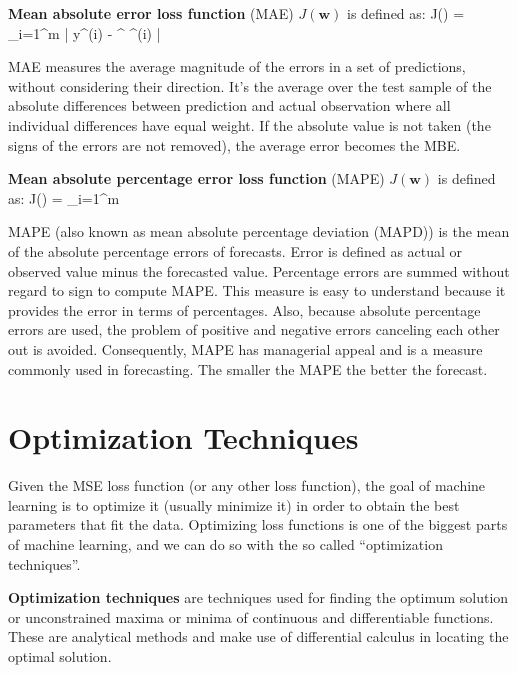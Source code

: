 \textbf{Mean absolute error loss function} (MAE) $J(\boldsymbol{w})$ is defined as:
\bse
J() =  \sum_{i=1}^{m} | y^{(i)} - ^{\intercal} ^{(i)} |
\ese
\ed

MAE measures the average magnitude of the errors in a set of predictions, without considering their direction. It's
the average over the test sample of the absolute differences between prediction and actual observation where all
individual differences have equal weight. If the absolute value is not taken (the signs of the errors are not
removed), the average error becomes the MBE\@.

\textbf{Mean absolute percentage error loss function} (MAPE) $J(\boldsymbol{w})$ is defined as:
\bse
J() =  \sum_{i=1}^{m} \Big{|}  \Big{|}
\ese
\ed

MAPE (also known as mean absolute percentage deviation (MAPD)) is the mean of the absolute percentage errors of
forecasts. Error is defined as actual or observed value minus the forecasted value. Percentage errors are summed
without regard to sign to compute MAPE. This measure is easy to understand because it provides the error in terms of
percentages. Also, because absolute percentage errors are used, the problem of positive and negative errors canceling
each other out is avoided. Consequently, MAPE has managerial appeal and is a measure commonly used in forecasting.
The smaller the MAPE the better the forecast.

\section{Optimization Techniques}

Given the MSE loss function (or any other loss function), the goal of machine learning is to optimize it (usually
minimize it) in order to obtain the best parameters that fit the data. Optimizing loss functions is one of the
biggest parts of machine learning, and we can do so with the so called ``optimization techniques''.

\textbf{Optimization techniques} are techniques used for finding the optimum solution or unconstrained maxima or
minima of continuous and differentiable functions. These are analytical methods and make use of differential calculus
in locating the optimal solution.
\ed


